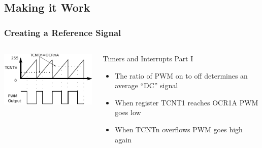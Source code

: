\documentclass{beamer}
\begin{document}
\subsection{Making it Work}

\begin{frame}
\frametitle{Creating a Reference Signal}
\begin{columns}[t]
	\column[c]{6cm}
	    \includegraphics[scale=1.25]{Bitbang}
	    
	\column[c]{5cm}

	\begin{exampleblock}{Timers and Interrupts Part I}
	\begin{itemize}
	\item {The ratio of PWM on to off determines an average ``DC'' signal}
	\item{When register TCNT1 reaches OCR1A PWM goes low}
	\item {When TCNTn overflows PWM goes high again}
	\end{itemize}
	
	\end{exampleblock}
\end{columns}
\end{frame}
\end{document}
